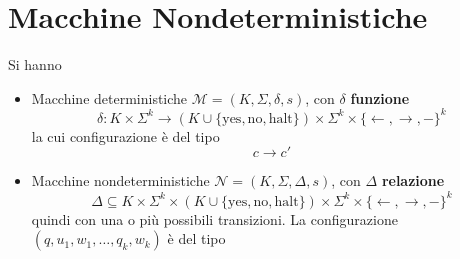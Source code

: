 \section{Macchine Nondeterministiche}
Si hanno
\begin{itemize}
    \item Macchine deterministiche $\mathcal{M}=(K,\Sigma,\delta,s)$, con $\delta$ \textbf{funzione}
    $$
        \delta:K\times\Sigma^k\to (K\cup\{\text{yes},\text{no},\text{halt}\}) \times \Sigma^k \times \{\gets,\to,-\}^k
    $$
    la cui configurazione è del tipo
    $$
        c \to c'
    $$
    \item Macchine nondeterministiche $\mathcal{N}=(K,\Sigma,\Delta,s)$, con $\Delta$ \textbf{relazione}
    $$
        \Delta\subseteq K\times\Sigma^k\times (K\cup\{\text{yes},\text{no},\text{halt}\}) \times \Sigma^k \times \{\gets,\to,-\}^k
    $$
    quindi con una o più possibili transizioni. La configurazione $(q,u_1,w_1,\dots,q_k,w_k)$ è del tipo 
    \begin{center}
    \end{center}    
\end{itemize}

